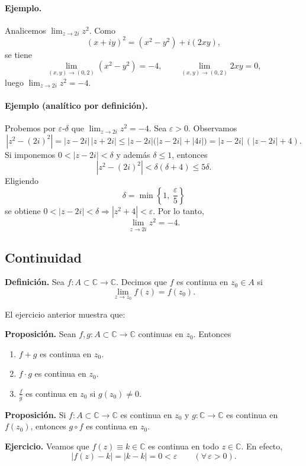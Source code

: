 \documentclass[a4paper,12pt]{article}
\begin{document}
\paragraph{Ejemplo.} Analicemos \(\displaystyle \lim_{z\to 2i} z^2\).
Como
\[
(x+iy)^2=(x^2-y^2)+i(2xy),
\]
se tiene
\[
\lim_{(x,y)\to(0,2)}(x^2-y^2)=-4,
\qquad
\lim_{(x,y)\to(0,2)}2xy=0,
\]
luego \(\displaystyle \lim_{z\to 2i} z^2=-4\).

\paragraph{Ejemplo (analítico por definición).}
Probemos por \(\varepsilon\)-\(\delta\) que \(\displaystyle \lim_{z\to 2i} z^2=-4\).
Sea \(\varepsilon>0\). Observamos
\[
|z^2-(2i)^2|=|z-2i|\,|z+2i|
\le |z-2i|\bigl(|z-2i|+|4i|\bigr)
=|z-2i|\,(|z-2i|+4).
\]
Si imponemos \(0<|z-2i|<\delta\) y además \(\delta\le 1\), entonces
\[
|z^2-(2i)^2|
< \delta(\delta+4)\le 5\delta.
\]
Eligiendo
\[
\delta=\min\!\left\{1,\ \frac{\varepsilon}{5}\right\}
\]
se obtiene \(0<|z-2i|<\delta \Rightarrow |z^2+4|<\varepsilon\). Por lo tanto,
\[
\lim_{z\to 2i} z^2=-4.
\]
\subsection{Continuidad}

\textbf{Definición.}
Sea \(f:A\subset\mathbb{C}\to\mathbb{C}\).
Decimos que \(f\) es continua en \(z_0\in A\) si
\[
\lim_{z\to z_0} f(z)=f(z_0).
\]

El ejercicio anterior muestra que:

\textbf{Proposición.}
Sean \(f,g:A\subset\mathbb{C}\to\mathbb{C}\) continuas en \(z_0\).
Entonces
\begin{enumerate}[label=(\arabic*)]
  \item \(f+g\) es continua en \(z_0\).
  \item \(f\cdot g\) es continua en \(z_0\).
  \item \(\displaystyle \frac{f}{g}\) es continua en \(z_0\) si \(g(z_0)\neq 0\).
\end{enumerate}

\textbf{Proposición.}
Si \(f:A\subset\mathbb{C}\to\mathbb{C}\) es continua en \(z_0\) y
\(g:\mathbb{C}\to\mathbb{C}\) es continua en \(f(z_0)\), entonces \(g\circ f\)
es continua en \(z_0\).

\textbf{Ejercicio.}
Veamos que \(f(z)\equiv k\in\mathbb{C}\) es continua en todo \(z\in\mathbb{C}\).
En efecto,
\[
|f(z)-k|=|k-k|=0<\varepsilon \qquad (\forall\,\varepsilon>0).
\]
\end{document}
